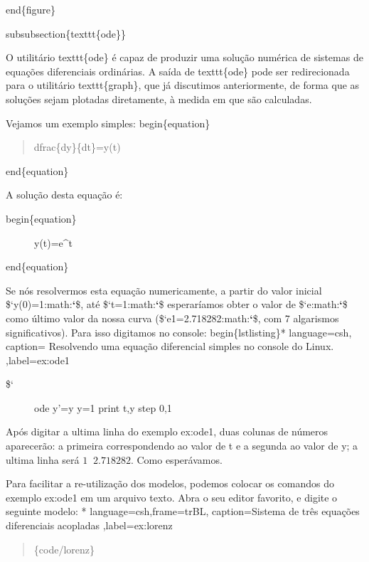 \documentclass[a4paper,10pt,portuguese]{sphinxmanual}
\begin{document}
end\{figure\}

subsubsection\{texttt\{ode\}\}

O utilitário texttt\{ode\} é capaz de produzir uma solução numérica de sistemas de equações diferenciais ordinárias. A saída de texttt\{ode\} pode ser redirecionada para o utilitário texttt\{graph\}, que já discutimos anteriormente, de forma que as soluções sejam plotadas diretamente, à medida em que são calculadas.

Vejamos um exemplo simples:
begin\{equation\}
\begin{quote}

dfrac\{dy\}\{dt\}=y(t)
\end{quote}

end\{equation\}

A solução desta equação é:
\begin{description}
\item[{begin\{equation\}}] \leavevmode
y(t)=e\textasciicircum{}t

\end{description}

end\{equation\}

Se nós resolvermos esta equação numericamente, a partir do valor inicial \${}`y(0)=1:math:{\color{red}\bfseries{}{}`}\$, até \${}`t=1:math:{\color{red}\bfseries{}{}`}\$ esperaríamos obter o valor de \${}`e:math:{\color{red}\bfseries{}{}`}\$ como último valor da nossa curva (\${}`e1=2.718282:math:{\color{red}\bfseries{}{}`}\$, com 7 algarismos significativos). Para isso digitamos no console:
begin\{lstlisting\}* language=csh, caption= Resolvendo uma equação diferencial simples no console do Linux. ,label=ex:ode1
\begin{description}
\item[{\${}`}] \leavevmode
ode y'=y y=1 print t,y step 0,1

\end{description}

Após digitar a ultima linha do exemplo ex:ode1, duas colunas de
números aparecerão: a primeira correspondendo ao valor de t e a
segunda ao valor de y; a ultima linha será $1\;\;2.718282$.
Como esperávamos.

Para facilitar a re-utilização dos modelos, podemos colocar os
comandos do exemplo ex:ode1 em um arquivo texto. Abra o seu editor
favorito, e digite o seguinte modelo:
* language=csh,frame=trBL, caption=Sistema de três equações diferenciais acopladas ,label=ex:lorenz
\begin{quote}

\{code/lorenz\}
\end{quote}
\end{document}
